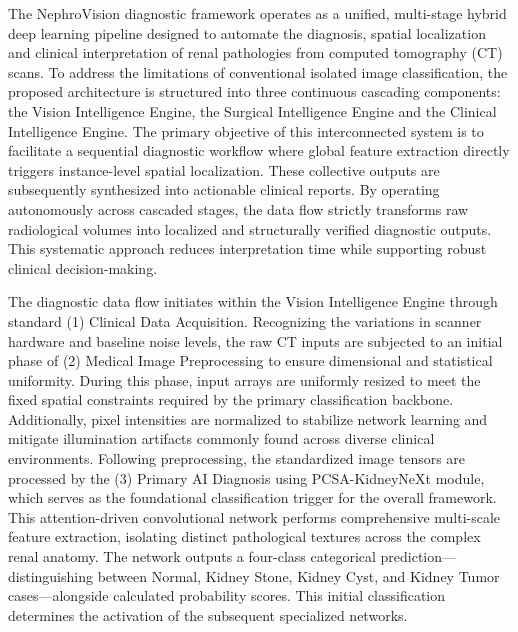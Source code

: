 \documentclass[]{elsarticle}
\begin{document}
The NephroVision diagnostic framework operates as a unified, multi-stage hybrid deep learning pipeline designed to automate the diagnosis, spatial localization and clinical interpretation of renal pathologies from computed tomography (CT) scans. To address the limitations of conventional isolated image classification, the proposed architecture is structured into three continuous cascading components: the Vision Intelligence Engine, the Surgical Intelligence Engine and the Clinical Intelligence Engine. The primary objective of this interconnected system is to facilitate a sequential diagnostic workflow where global feature extraction directly triggers instance-level spatial localization. These collective outputs are subsequently synthesized into actionable clinical reports. By operating autonomously across cascaded stages, the data flow strictly transforms raw radiological volumes into localized and structurally verified diagnostic outputs. This systematic approach reduces interpretation time while supporting robust clinical decision-making.

The diagnostic data flow initiates within the Vision Intelligence Engine through standard (1) Clinical Data Acquisition. Recognizing the variations in scanner hardware and baseline noise levels, the raw CT inputs are subjected to an initial phase of (2) Medical Image Preprocessing to ensure dimensional and statistical uniformity. During this phase, input arrays are uniformly resized to meet the fixed spatial constraints required by the primary classification backbone. Additionally, pixel intensities are normalized to stabilize network learning and mitigate illumination artifacts commonly found across diverse clinical environments. Following preprocessing, the standardized image tensors are processed by the (3) Primary AI Diagnosis using PCSA-KidneyNeXt module, which serves as the foundational classification trigger for the overall framework. This attention-driven convolutional network performs comprehensive multi-scale feature extraction, isolating distinct pathological textures across the complex renal anatomy. The network outputs a four-class categorical prediction—distinguishing between Normal, Kidney Stone, Kidney Cyst, and Kidney Tumor cases—alongside calculated probability scores. This initial classification determines the activation of the subsequent specialized networks.
\end{document}
